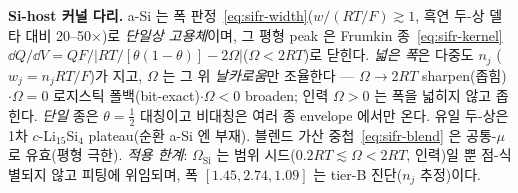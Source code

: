 \begin{keybox}
\textbf{Si-host 커널 다리.} a-Si 는 폭 판정~\eqref{eq:sifr-width}($w/(RT/F)\gtrsim1$, 흑연 두-상 델타 대비
20--50$\times$)로 \emph{단일상 고용체}이며, 그 평형 peak 은 Frumkin 종~\eqref{eq:sifr-kernel}
$\dd Q/\dd V=QF/|RT/[\theta(1-\theta)]-2\Omega|$($\Omega<2RT$)로 닫힌다. \emph{넓은 폭}은 다중도 $n_j$
($w_j{=}n_jRT/F$)가 지고, $\Omega$ 는 그 위 \emph{날카로움}만 조율한다 --- $\Omega{\to}2RT$ sharpen(좁힘)$\cdot\Omega{=}0$
로지스틱 폴백(bit-exact)$\cdot\Omega<0$ broaden; 인력 $\Omega{>}0$ 는 폭을 넓히지 않고 좁힌다. \emph{단일} 종은
$\theta{=}\tfrac12$ 대칭이고 비대칭은 여러 종 envelope 에서만 온다. 유일 두-상은 1차 $c$-Li$_{15}$Si$_4$
plateau(순환 a-Si 엔 부재). 블렌드 가산 중첩~\eqref{eq:sifr-blend} 은 공통-$\mu$ 로 유효(평형 극한).
\emph{적용 한계}: $\Omega_\mathrm{Si}$ 는 범위 시드($0.2RT\lesssim\Omega<2RT$, 인력)일 뿐 점-식별되지 않고
피팅에 위임되며, 폭 $[1.45,2.74,1.09]$ 는 tier-B 진단($n_j$ 추정)이다.
\end{keybox}

